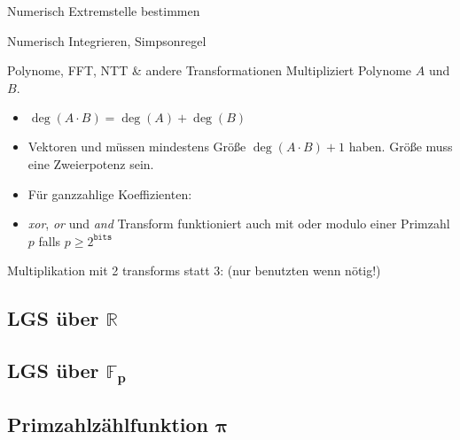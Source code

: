 \begin{algorithm}{Numerisch Extremstelle bestimmen}
\end{algorithm}


\begin{algorithm}{Numerisch Integrieren, Simpsonregel}
\end{algorithm}

\begin{algorithm}{Polynome, FFT, NTT \& andere Transformationen}
	Multipliziert Polynome $A$ und $B$.
	\begin{itemize}
		\item $\deg(A \cdot B) = \deg(A) + \deg(B)$
		\item Vektoren  und  müssen mindestens Größe
		$\deg(A \cdot B) + 1$ haben.
		Größe muss eine Zweierpotenz sein.
		\item Für ganzzahlige Koeffizienten: 
		\item \emph{xor}, \emph{or} und \emph{and} Transform funktioniert auch mit  oder modulo einer Primzahl $p$ falls $p \geq 2^{\texttt{bits}}$
	\end{itemize}
	Multiplikation mit 2 transforms statt 3: (nur benutzten wenn nötig!)
\end{algorithm}

\subsection{LGS über $\boldsymbol{\mathbb{R}}$}

\subsection{LGS über $\boldsymbol{\mathbb{F}_p}$}

\clearpage

\subsection{Primzahlzählfunktion $\boldsymbol{\pi}$}
\begin{methods}
\end{methods}

